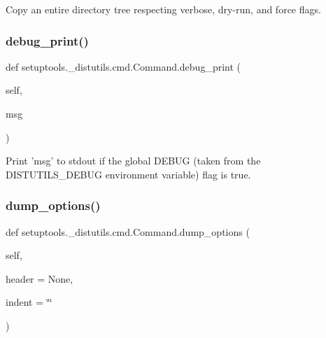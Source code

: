 \begin{DoxyVerb}Copy an entire directory tree respecting verbose, dry-run,
and force flags.
\end{DoxyVerb}
 \mbox{\label{classsetuptools_1_1__distutils_1_1cmd_1_1Command_ac12b68aa111c3baaf4599fb441227726}} 
\subsubsection{\texorpdfstring{debug\+\_\+print()}{debug\_print()}}
{\footnotesize\ttfamily def setuptools.\+\_\+distutils.\+cmd.\+Command.\+debug\+\_\+print (\begin{DoxyParamCaption}\item[{}]{self,  }\item[{}]{msg }\end{DoxyParamCaption})}

\begin{DoxyVerb}Print 'msg' to stdout if the global DEBUG (taken from the
DISTUTILS_DEBUG environment variable) flag is true.
\end{DoxyVerb}
 \mbox{\label{classsetuptools_1_1__distutils_1_1cmd_1_1Command_a3e328bc55079ef34e3e9ef7bed5f10ca}} 
\subsubsection{\texorpdfstring{dump\+\_\+options()}{dump\_options()}}
{\footnotesize\ttfamily def setuptools.\+\_\+distutils.\+cmd.\+Command.\+dump\+\_\+options (\begin{DoxyParamCaption}\item[{}]{self,  }\item[{}]{header = {\ttfamily None},  }\item[{}]{indent = {\ttfamily \char`\"{}\char`\"{}} }\end{DoxyParamCaption})}

